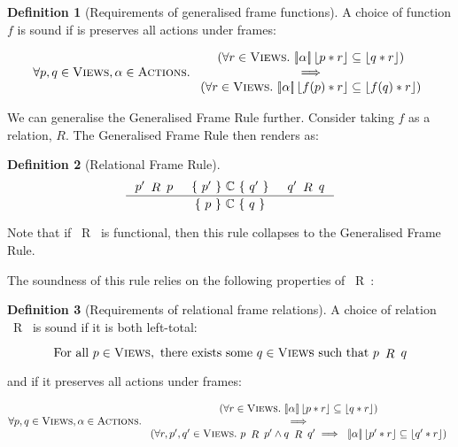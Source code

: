 \documentclass{article}
\theoremstyle{definition}
\newtheorem{definition}{Definition}
\theoremstyle{theorem}
\newcommand{\Code}{\mathbb{C}}
\newcommand{\Views}{\textsc{Views}}
\newcommand{\Actions}{\textsc{Actions}}
\newcommand{\action}{\alpha}
\newcommand{\frameRel}{~\mathop{R}~}
\newcommand{\act}[1]{[\!| #1 |\!]}
\newcommand{\reify}[1]{\left\lfloor{#1}\right\rfloor}
\newcommand{\triple}[3]{\{\ #1\ \}\ #2\ \{\ #3\ \}}
\begin{document}
\begin{definition}[Requirements of generalised frame functions]
  A choice of function $f$ is sound if is preserves all actions under frames:

  \begin{displaymath}
    \forall p, q \in \Views, \action \in \Actions.~
    \begin{array}{c}
      (\forall r \in \Views.~\act{\action}\reify{p * r} \subseteq \reify{q * r})
      \\ \implies \\
      (\forall r \in \Views.~\act{\action}\reify{f(p) * r} \subseteq \reify{f(q) * r})
    \end{array}
  \end{displaymath}
\end{definition}

We can generalise the Generalised Frame Rule further. Consider taking $f$ as a relation, $R$. The Generalised Frame Rule then renders as:

\begin{definition}[Relational Frame Rule]
  \begin{displaymath}
    \inference{p' \frameRel p & \triple{p'}{\Code}{q'} & q' \frameRel q}
              {\triple{p}{\Code}{q}}
  \end{displaymath}
\end{definition}

Note that if $\frameRel$ is functional, then this rule collapses to the Generalised Frame Rule.

The soundness of this rule relies on the following properties of $\frameRel$:

\begin{definition}[Requirements of relational frame relations]
  \label{definition:relationalFrameReqs}
  A choice of relation $\frameRel$ is sound if it is both left-total:

  \begin{displaymath}
    \text{For all } p \in \Views, \text{ there exists some } q \in \Views \text{ such that } p \frameRel q
  \end{displaymath}

  and if it preserves all actions under frames:

  \begin{displaymath}
    \forall p, q \in \Views, \action \in \Actions.~
    \begin{array}{c}
      (\forall r \in \Views.~\act{\action}\reify{p * r} \subseteq \reify{q * r})
      \\ \implies \\
      (\forall r, p', q' \in \Views.~p \frameRel p' \land q \frameRel q' \implies ~\act{\action}\reify{p' * r} \subseteq \reify{q' * r})
    \end{array}
  \end{displaymath}
\end{definition}
\end{document}

